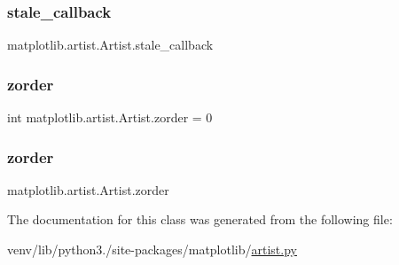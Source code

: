 \subsubsection{\texorpdfstring{stale\+\_\+callback}{stale\_callback}}
{\footnotesize\ttfamily matplotlib.\+artist.\+Artist.\+stale\+\_\+callback}

\mbox{\label{classmatplotlib_1_1artist_1_1Artist_a210781a1646a5f1e9a1a82bf488c314f}} 
\subsubsection{\texorpdfstring{zorder}{zorder}\hspace{0.1cm}{\footnotesize\ttfamily [1/2]}}
{\footnotesize\ttfamily int matplotlib.\+artist.\+Artist.\+zorder = 0\hspace{0.3cm}{\ttfamily [static]}}

\mbox{\label{classmatplotlib_1_1artist_1_1Artist_a0d332802b2a7d805f42f1f84a05ddbbd}} 
\subsubsection{\texorpdfstring{zorder}{zorder}\hspace{0.1cm}{\footnotesize\ttfamily [2/2]}}
{\footnotesize\ttfamily matplotlib.\+artist.\+Artist.\+zorder}



The documentation for this class was generated from the following file\+:\begin{DoxyCompactItemize}
\item 
venv/lib/python3./site-\/packages/matplotlib/\hyperlink{artist_8py}{artist.\+py}\end{DoxyCompactItemize}
